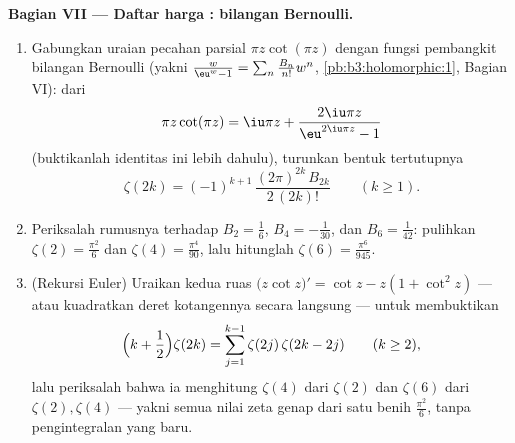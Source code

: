 \begin{problem}
\begin{enumerate}[resume]
\end{enumerate}
\medskip
\noindent\textbf{Bagian VII --- Daftar harga : bilangan
Bernoulli.}
\begin{enumerate}[resume]
  \item Gabungkan uraian pecahan parsial $\pi
        z\cot(\pi z)$ dengan fungsi pembangkit
        bilangan Bernoulli (yakni $\frac{w}{\eu^w - 1} =
        \sum_n\frac{B_n}{n!}w^n$,
        \cref{pb:b3:holomorphic:1}, Bagian VI): dari
        \[
        \pi z\cot(\pi z) = \iu\pi z +
        \frac{2\iu\pi z}{\eu^{2\iu\pi z} - 1}
        \]
        (buktikanlah identitas ini lebih dahulu), turunkan bentuk tertutupnya
        \[
        \zeta(2k) = (-1)^{k+1}\,
        \frac{(2\pi)^{2k}\,B_{2k}}{2\,(2k)!}
        \qquad (k \geq 1).
        \]
  \item Periksalah rumusnya terhadap $B_2 = \frac16$, $B_4 =
        -\frac1{30}$, dan $B_6 = \frac1{42}$: pulihkan $\zeta(2) =
        \frac{\pi^2}6$ dan $\zeta(4) = \frac{\pi^4}{90}$, lalu
        hitunglah $\zeta(6) = \frac{\pi^6}{945}$.
  \item (Rekursi Euler) Uraikan kedua ruas
        $\bigl(z\cot z\bigr)' = \cot z - z(1 + \cot^2z)$ ---
        atau kuadratkan deret kotangennya secara langsung --- untuk membuktikan
        \[
        \Bigl(k + \frac12\Bigr)\zeta(2k) =
        \sum_{j=1}^{k-1}\zeta(2j)\,\zeta(2k - 2j)
        \qquad (k \geq 2),
        \]
        lalu periksalah bahwa ia menghitung $\zeta(4)$ dari $\zeta(2)$ dan
        $\zeta(6)$ dari $\zeta(2), \zeta(4)$ --- yakni semua nilai zeta
        genap dari satu benih $\frac{\pi^2}6$,
        tanpa pengintegralan yang baru.

\end{enumerate}
\end{problem}
